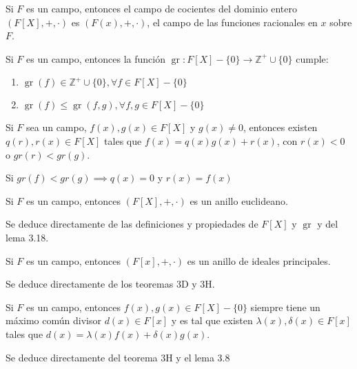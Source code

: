 \begin{definicion}
    Si $F$ es un campo, entonces el campo de cocientes del dominio entero $(F[X],+,\cdot)$ es $(F(x),+,\cdot)$, el campo de las funciones racionales en $x$ sobre $F$. 
\end{definicion}

\begin{prop}
    Si $F$ es un campo, entonces la función $\operatorname{gr}:F[X]-\{0\}\to \mathbb{Z}^+\cup\{0\}$ cumple: 
    \begin{enumerate}
        \item $\operatorname{gr}(f)\in \mathbb{Z}^+\cup\{0\},\forall f\in F[X]-\{0\}$
        \item $\operatorname{gr}(f)\leq \operatorname{gr}(f,g),\forall f,g\in F[X]-\{0\}$
    \end{enumerate}
\end{prop}

\begin{lema}
    Si $F$ sea un campo, $f(x),g(x)\in F[X]$ y $g(x)\neq 0$, entonces existen $q(r),r(x)\in F[X]$ tales que $f(x)=q(x)g(x)+r(x)$, con $r(x)<0$ o $gr(r)<gr(g)$.
    \begin{dem}
        Si $gr(f)<gr(g)\implies q(x)=0$ y $r(x)=f(x)$
    \end{dem}
\end{lema}


\begin{teorema}[3H]
    Si $F$ es un campo, entonces $(F[X],+,\cdot)$ es un anillo euclideano.
    \begin{dem}
        Se deduce directamente de las definiciones y propiedades de $F[X]$ y $\operatorname{gr}$ y del lema 3.18. 
    \end{dem}
\end{teorema}

\begin{lema}[3.19]
    Si $F$ es un campo, entonces $(F[x],+,\cdot)$ es un anillo de ideales principales. 
    \begin{dem}
        Se deduce directamente de los teoremas 3D y 3H. 
    \end{dem}
\end{lema}

\begin{lema}[3.20]
    Si $F$ es un campo, entonces $f(x),g(x)\in F[X]-\{0\}$ siempre tiene un máximo común divisor $d(x)\in F[x]$ y es tal que existen $\lambda(x),\delta(x)\in F[x]$ tales que $d(x)=\lambda(x)f(x)+\delta(x)g(x)$.
    \begin{dem}
        Se deduce directamente del teorema 3H y el lema 3.8
    \end{dem} 
\end{lema}

